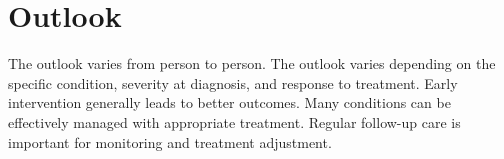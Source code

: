 \section{Outlook}
The outlook varies from person to person. The outlook varies depending on the specific condition, severity at diagnosis, and response to treatment. Early intervention generally leads to better outcomes. Many conditions can be effectively managed with appropriate treatment. Regular follow-up care is important for monitoring and treatment adjustment.
